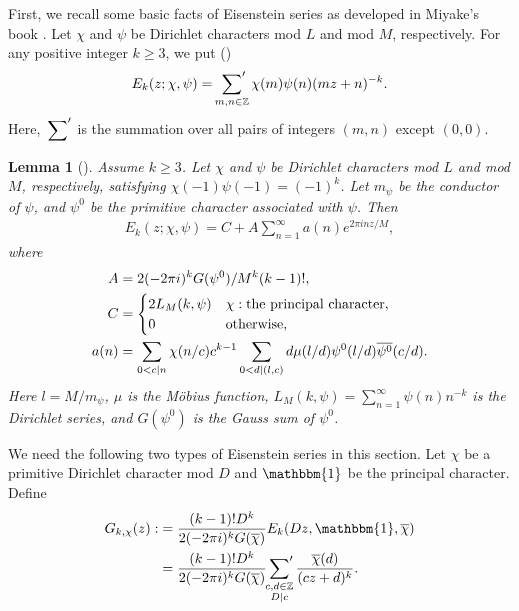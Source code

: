 \documentclass[11pt,letterpaper,reqno]{amsart}
\numberwithin{figure}{section}
\numberwithin{table}{section}
\theoremstyle{definition}
\theoremstyle{plain}
\newtheorem{lemma}[theorem]{Lemma}
\theoremstyle{definition}
\theoremstyle{definition}
\theoremstyle{remark}
\numberwithin{equation}{section}
\theoremstyle{remark}
\begin{document}
First, we recall  some basic facts of Eisenstein series as developed in Miyake's book \cite[\S 7]{MiyakeMFbook}. Let $\chi$ and $\psi$ be Dirichlet characters mod $L$ and mod $M$, respectively. For any positive integer $k\geq3$, we put (\cite[\S7]{MiyakeMFbook})
\begin{align}
    E_{k}(z;\chi,\psi)=\sideset{}{'}\sum\limits_{m,n\in\mathbb{Z}}\chi(m)\psi(n)(mz+n)^{-k}.\nonumber
\end{align}
Here,  $\sideset{}{'}\sum$ is the summation over all pairs of integers $(m,n)$ except $(0,0)$. 
\label{lem:EisensteinFourierexpansion}
    \begin{lemma}[{\cite[Theorem 7.1.3]{MiyakeMFbook}}] 
Assume $k\geq3$. Let $\chi$ and $\psi$ be Dirichlet characters mod $L$ and mod $M$, respectively, satisfying $\chi(-1)\psi(-1)=(-1)^k$. Let $m_{\psi}$ be the conductor of $\psi$, and $\psi^0$ be the primitive character associated with $\psi$. Then 
    \begin{align}
        E_{k}(z;\chi,\psi)=C+A\sum_{n=1}^{\infty}a(n)e^{2\pi inz/M},\nonumber
    \end{align}
    where 
    \begin{align}
        A&=2(-2\pi i)^kG(\psi^0)/M^{k}(k-1)!,\nonumber\\
        C&=\begin{cases}2L_M(k,\psi) &\chi:{\rm the~principal~character},\nonumber\\
            0 &{\rm otherwise},
        \end{cases}\nonumber\\
        a(n)&=\sum_{0<c\mid n}\chi(n/c)c^{k-1}\sum_{0<d\mid(l,c)}d\mu(l/d)\psi^0(l/d)\overline{\psi^0}(c/d).\nonumber
    \end{align}
    Here $l=M/m_{\psi}$, $\mu$ is the M\"obius function, $L_M(k,\psi)=\sum_{n=1}^{\infty}\psi(n)n^{-k}$ is the Dirichlet series, and $G(\psi^0)$ is the Gauss sum of $\psi^0$.\end{lemma}
We need the following two types of Eisenstein series in this section. Let $\chi$ be a primitive Dirichlet character mod $D$ and $\mathbbm{1}$ be the principal character. 
Define
\begin{align}
    G_{k,\chi}(z):&=\frac{(k-1)!D^k}{2(-2\pi i)^kG(\overline{\chi})}E_k(Dz,\mathbbm{1},\overline{\chi})\nonumber\\&=\frac{(k-1)!D^k}{2(-2\pi i)^kG(\overline{\chi})}\sideset{}{'}\sum_{\substack{c,d\in\mathbb{Z}\\D\mid c}}\frac{\overline{\chi}(d)}{(cz+d)^k}.\label{eq:GkDforcomputingFourier}
\end{align}
\end{document}
